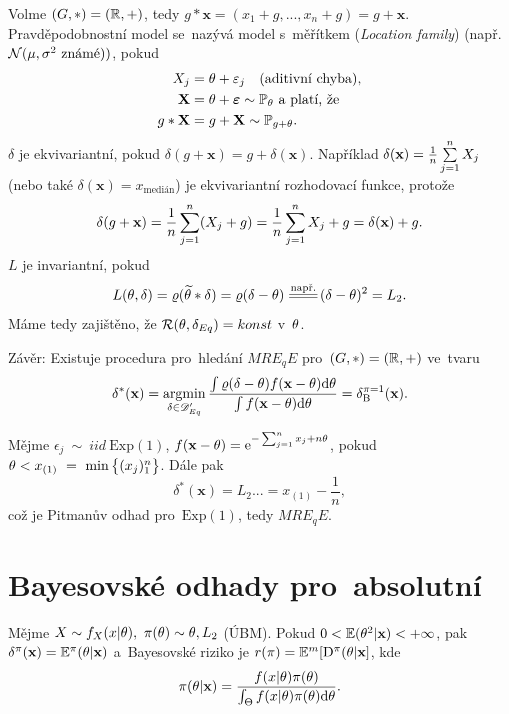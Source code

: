 \begin{example}
	Volme $(G,\ast)=(\mathbb{R},+)$, tedy $g\ast\textbf{x}=(x_1+g,...,x_n+g)=g+\textbf{x}$. Pravděpodobnostní model se~nazývá model s~měřítkem (\textit{Location family}) (např. $\mathcal{N}(\mu,\sigma^2 \text{ známé}))$, pokud
	\[
	\begin{split}
	X_j&=\theta+\varepsilon_j\quad(\text{aditivní chyba}),\\
	\textbf{X}&=\theta+\boldsymbol{\varepsilon}\sim\mathbb{P}_\theta\text{ a~platí, že }\\
	g\ast \textbf{X}&=g+\textbf{X}\sim \mathbb{P}_{g+\theta}.
	\end{split}
	\]
	$\delta$ je ekvivariantní, pokud $\delta(g+\textbf{x})=g+\delta(\textbf{x})$. Například $\delta(\textbf{x})=\frac{1}{n}\sum\limits_{j=1}^{n} X_j$ (nebo také $\delta(\textbf{x})=x_{\text{medián}}$) je ekvivariantní rozhodovací funkce, protože $$\delta(g+\textbf{x})=\frac{1}{n}\sum\limits_{j=1}^{n} (X_j+g)=\frac{1}{n}\sum\limits_{j=1}^{n} X_j + g=\delta(\textbf{x})+g.$$ $L$ je invariantní, pokud $$L(\t,\delta)=\rho(\widetilde{\t}\ast\delta)=\rho(\delta-\t)\equal{\text{např.}}(\delta-\t)^2=L_2.$$ Máme tedy zajištěno, že $\mathcal{R}(\theta,\delta_{Eq})=konst$ v~$\theta$.
	
	Závěr: Existuje procedura pro~hledání $MRE_qE$ pro~$(G,\ast)=(\mathbb{R},+)$ ve~tvaru
	$$ \delta^\ast(\textbf{x})=\mathop{\mathrm{argmin}}_{\delta\in\mathscr{D}' _{Eq}}\frac{\int\varrho(\delta-\theta)f(\textbf{x}-\theta)\mathrm{d}\theta}{\int f(\textbf{x}-\theta)\mathrm{d}\theta}=\delta_\mathrm{B}^{\pi=1}(\textbf{x}).$$
\end{example}
\begin{example}
	Mějme $\epsilon_j~\sim~iid~\mathrm{Exp}(1)$, $f(\textbf{x}-\theta)=\mathrm{e}^{-\sum_{j=1}^n x_j+n\theta}$, pokud $\theta< x_{(1)}~=~\min\big\{ (x_j)_1^n\big\}$. Dále pak
	$$ \delta^\ast(\textbf{x})\equal{L_2}...=x_{(1)}-\frac{1}{n},$$ což je Pitmanův odhad pro~$\mathrm{Exp}(1)$, tedy $MRE_qE$.
\end{example}

\chapter{Bayesovské odhady pro~absolutní}

\begin{remark}\label{veta1}
	Mějme $X\sim f_{X}(x|\theta),~\pi(\theta)\sim \theta,L_2$ (ÚBM). Pokud $0<\mathbb{E}(\theta^2|\textbf{x})<+\infty$, pak $\delta^\pi(\textbf{x})=\mathbb{E}^\pi(\theta|\textbf{x})$ a~Bayesovské riziko  je $r(\pi)=\mathbb{E}^m[\mathrm{D}^\pi(\theta|\textbf{x}]$, kde $$\pi(\theta|\textbf{x})=\frac{f(x|\theta)\pi(\theta)}{\int_\Theta f(x|\theta)\pi(\theta)\mathrm{d}\theta}.$$ 
\end{remark}

